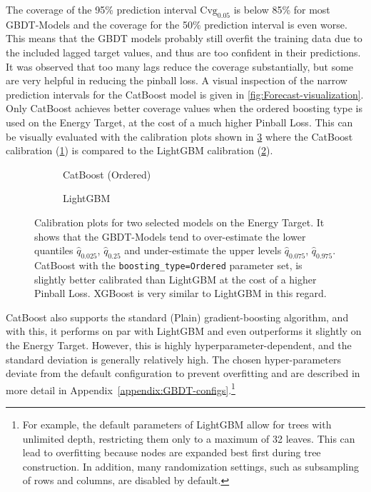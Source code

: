 The coverage of the 95\% prediction interval $\text{Cvg}_{0.05}$ is below 85\% for most GBDT-Models and the coverage for the 50\% prediction interval is even worse. This means that the GBDT models probably still overfit the training data due to the included lagged target values, and thus are too confident in their predictions. It was observed that too many lags reduce the coverage substantially, but some are very helpful in reducing the pinball loss. A visual inspection of the narrow prediction intervals for the CatBoost model is given in \cref{fig:Forecast-visualization}.
Only CatBoost achieves better coverage values when the ordered boosting type is used on the Energy
Target, at the cost of a much higher Pinball Loss. This can be visually evaluated with the calibration plots shown in \cref{fig:calibration-comparison} where the CatBoost calibration (\cref{fig:catboost-ordered-calibration}) is compared to the LightGBM calibration (\cref{fig:lgbm-calibration}).
\begin{figure}[htbp]
    \centering
    \begin{subfigure}[b]{0.5\textwidth}
        \centering
        
        \caption{CatBoost (Ordered)}
        \label{fig:catboost-ordered-calibration}
    \end{subfigure}%
    \begin{subfigure}[b]{0.5\textwidth}
        \centering
        
        \caption{LightGBM}
        \label{fig:lgbm-calibration}
    \end{subfigure}
    \caption{Calibration plots for two selected models on the Energy Target. It shows that the GBDT-Models  tend to over-estimate the lower quantiles $\hat{q}_{0.025}$, $\hat{q}_{0.25}$ and under-estimate the upper levels $\hat{q}_{0.075}$, $\hat{q}_{0.975}$. CatBoost with the \texttt{boosting\_type=Ordered} parameter set, is slightly better calibrated than LightGBM at the cost of a higher Pinball Loss. XGBoost is very similar to LightGBM in this regard.}
    \label{fig:calibration-comparison}
\end{figure}

CatBoost also supports the standard (Plain) gradient-boosting algorithm,
and with this, it performs on par with LightGBM and even outperforms it slightly on
the Energy Target. However, this is highly hyperparameter-dependent, and the standard
deviation is generally relatively high. The chosen hyper-parameters deviate from the default 
configuration to prevent overfitting and are described in more detail in Appendix~\ref{appendix:GBDT-configs}.\footnote{For example, the default parameters of LightGBM allow for trees with unlimited depth, restricting them only to a maximum of 32 leaves. This can lead to overfitting because nodes are expanded best first during tree construction. In addition, many randomization settings, such as subsampling of rows and columns, are disabled by default.}


